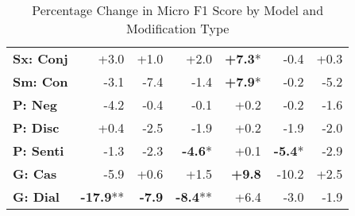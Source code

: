 \begin{table}[h]
\begin{tabular}{lrrrrrr}
\textbf{Sx: Conj} & \cellcolor{green!9} +3.0 & \cellcolor{green!2} +1.0 & \cellcolor{green!5} +2.0 & \cellcolor{green!22} \textbf{+7.3}* & \cellcolor{red!1} -0.4 & \cellcolor{green!1} +0.3 \\
\textbf{Sm: Con} & \cellcolor{red!9} -3.1 & \cellcolor{red!22} -7.4 & \cellcolor{red!4} -1.4 & \cellcolor{green!23} \textbf{+7.9}* & \cellcolor{red!0} -0.2 & \cellcolor{red!15} -5.2 \\
\hline
\textbf{P: Neg} & \cellcolor{red!12} -4.2 & \cellcolor{red!1} -0.4 & \cellcolor{red!0} -0.1 & \cellcolor{green!0} +0.2 & \cellcolor{red!0} -0.2 & \cellcolor{red!4} -1.6 \\
\textbf{P: Disc} & \cellcolor{green!1} +0.4 & \cellcolor{red!7} -2.5 & \cellcolor{red!5} -1.9 & \cellcolor{green!0} +0.2 & \cellcolor{red!5} -1.9 & \cellcolor{red!6} -2.0 \\
\textbf{P: Senti} & \cellcolor{red!3} -1.3 & \cellcolor{red!6} -2.3 & \cellcolor{red!13} \textbf{-4.6}* & \cellcolor{green!0} +0.1 & \cellcolor{red!16} \textbf{-5.4}* & \cellcolor{red!8} -2.9 \\
\hline
\textbf{G: Cas} & \cellcolor{red!17} -5.9 & \cellcolor{green!1} +0.6 & \cellcolor{green!4} +1.5 & \cellcolor{green!29} \textbf{+9.8} & \cellcolor{red!30} -10.2 & \cellcolor{green!7} +2.5 \\
\textbf{G: Dial} & \cellcolor{red!30} \textbf{-17.9}** & \cellcolor{red!23} \textbf{-7.9} & \cellcolor{red!25} \textbf{-8.4}** & \cellcolor{green!19} +6.4 & \cellcolor{red!8} -3.0 & \cellcolor{red!5} -1.9 \\
\hline
\end{tabular}
\caption{Percentage Change in Micro F1 Score by Model and Modification Type}
\label{tab:ner_results}
\end{table}